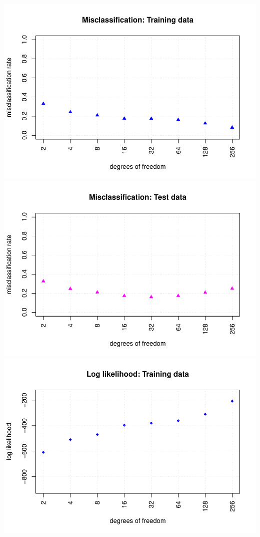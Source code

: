 \documentclass[
]{article}
\begin{document}
\includegraphics{A2_files/figure-latex/unnamed-chunk-24-1.pdf}
\includegraphics{A2_files/figure-latex/unnamed-chunk-24-2.pdf}
\includegraphics{A2_files/figure-latex/unnamed-chunk-24-3.pdf}
\end{document}
